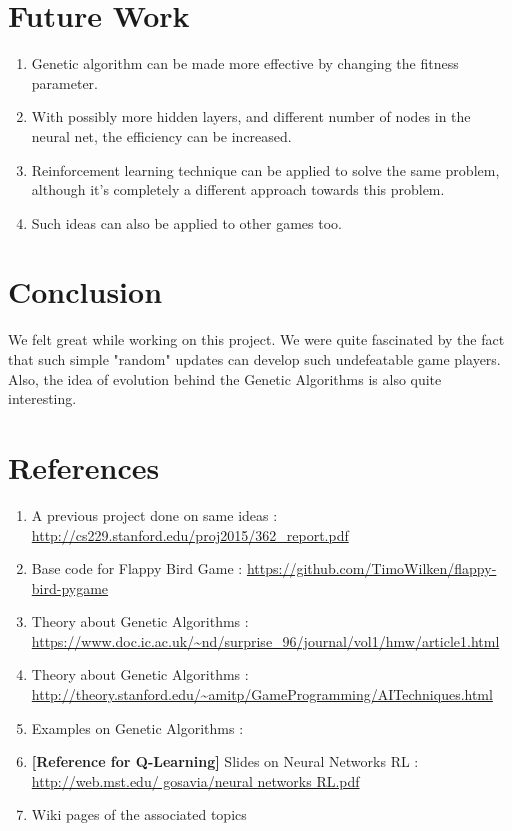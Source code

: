 \documentclass{article}
\begin{document}
\section {Future Work}
\begin{enumerate}
    \item Genetic algorithm can be made more effective by changing the fitness parameter.
    \item With possibly more hidden layers, and different number of nodes in the neural net, the efficiency can be increased.
    \item Reinforcement learning technique can be applied to solve the same problem, although it's completely a different approach towards this problem. 
    \item Such ideas can also be applied to other games too.     
\end{enumerate}

\section{Conclusion}
We felt great while working on this project. We were quite fascinated by the fact that such simple "random" updates can develop such undefeatable game players. Also, the idea of evolution behind the Genetic Algorithms is also quite interesting.

\section{References}
\begin{enumerate}
\item A previous project done on same ideas : \url{http://cs229.stanford.edu/proj2015/362_report.pdf}
\item Base code for Flappy Bird Game : \url{https://github.com/TimoWilken/flappy-bird-pygame}
\item Theory about Genetic Algorithms : \url{https://www.doc.ic.ac.uk/~nd/surprise_96/journal/vol1/hmw/article1.html}
\item Theory about Genetic Algorithms : \url{http://theory.stanford.edu/~amitp/GameProgramming/AITechniques.html}
\item Examples on Genetic Algorithms :
\item \textbf{[Reference for Q-Learning]} Slides on Neural Networks RL : \url{http://web.mst.edu/ gosavia/neural networks RL.pdf}  
\item Wiki pages of the associated topics
\end{enumerate}
\end{document}
